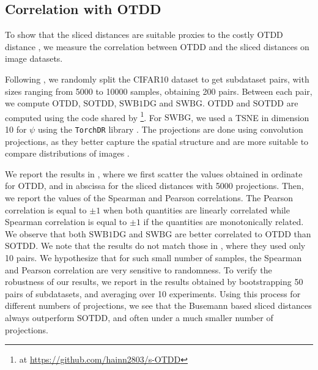 \documentclass[twoside]{article}
\newcommand{\sotdd}{\mathrm{SOTDD}}
\newcommand{\swbdg}{\mathrm{SWB1DG}}
\newcommand{\swbg}{\mathrm{SWBG}}
\begin{document}
\subsection{Correlation with OTDD}

To show that the sliced distances are suitable proxies to the costly OTDD distance \citep{alvarez2020geometric}, we measure the correlation between OTDD and the sliced distances on image datasets.


 Following \citep{nguyen2025lightspeed},  we randomly split the CIFAR10 dataset \citep{krizhevsky2009learning} to get subdataset pairs, with sizes ranging from 5000 to 10000 samples, obtaining 200 pairs. Between each pair, we compute OTDD, $\sotdd$, $\swbdg$ and $\swbg$. OTDD and $\sotdd$ are computed using the code shared by \citet{nguyen2025lightspeed}\footnote{at \url{https://github.com/hainn2803/s-OTDD}}. For $\swbg$, we used a TSNE in dimension 10 for $\psi$ using the \texttt{TorchDR} library \citep{torchdr}. The projections are done using convolution projections, as they better capture the spatial structure and are more suitable to compare distributions of images \citep{nguyen2022revisiting}.





We report the results in , where we first scatter the values obtained in ordinate for OTDD, and in abscissa for the sliced distances with 5000 projections. Then, we report the values of the Spearman and Pearson correlations.%
The Pearson correlation is equal to $\pm1$ when both quantities are linearly correlated while Spearman correlation is equal to $\pm1$ if the quantities are monotonically related. We observe that both $\swbdg$ and $\swbg$ are better correlated to OTDD than $\sotdd$.
We note that the results do not match those in \citep{nguyen2025lightspeed}, where they used only 10 pairs. We hypothesize that for such small number of samples, the Spearman and Pearson correlation are very sensitive to randomness. To verify the robustness of our results, we report in  the results obtained by bootstrapping 50 pairs of subdatasets, and averaging over 10 experiments. Using this process for different numbers of projections, we see that the Busemann based sliced distances always outperform $\sotdd$, and often under a much smaller number of projections. 
\end{document}
